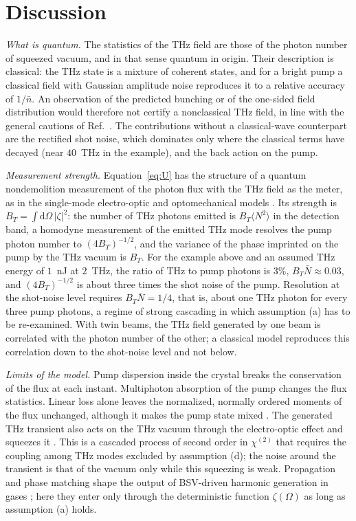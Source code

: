 \documentclass[aps,pra,reprint,superscriptaddress,amsmath,amssymb,floatfix]{revtex4-2}
\newcommand{\nbar}{\bar n}
\newcommand{\Nbar}{\bar N}
\newcommand{\dd}{\mathrm{d}}
\begin{document}
\section{Discussion}
\label{sec:discussion}

\emph{What is quantum.} The statistics of the THz field are those of the
photon number of squeezed vacuum, and in that sense quantum in origin. Their
description is classical: the THz state is a mixture of coherent states, and
for a bright pump a classical field with Gaussian amplitude noise reproduces
it to a relative accuracy of $1/\nbar$. An observation of the predicted
bunching or of the one-sided field distribution would therefore not certify a
nonclassical THz field, in line with the general cautions of
Ref.~\cite{gothelf2026}. The contributions without a classical-wave
counterpart are the rectified shot noise, which dominates only where the
classical terms have decayed (near $40$~THz in the example), and the back
action on the pump.

\emph{Measurement strength.} Equation~\eqref{eq:U} has the structure of a
quantum nondemolition measurement of the photon flux with the THz field as
the meter, as in the single-mode electro-optic and optomechanical models
\cite{tsang2010,bose1997}. Its strength is $B_T=\int\!\dd\Omega\,|\zeta|^2$:
the number of THz photons emitted is $B_T\langle N^2\rangle$ in the detection
band, a homodyne measurement of the emitted THz mode resolves the pump photon
number to $(4B_T)^{-1/2}$, and the variance of the phase imprinted on the pump
by the THz vacuum is $B_T$. For the example above and an assumed THz energy of
$1$~nJ at $2$~THz, the ratio of THz to pump photons is $3\%$,
$B_T\Nbar\approx0.03$, and $(4B_T)^{-1/2}$ is about three times the shot noise
of the pump. Resolution at the shot-noise level requires $B_T\Nbar=1/4$, that
is, about one THz photon for every three pump photons, a regime of strong
cascading \cite{ravi2014} in which assumption (a) has to be re-examined. With twin beams, the THz field
generated by one beam is correlated with the photon number of the other; a
classical model reproduces this correlation down to the shot-noise level and
not below.

\emph{Limits of the model.} Pump dispersion inside the crystal breaks the
conservation of the flux at each instant. Multiphoton absorption of the pump
changes the flux statistics. Linear loss alone leaves the normalized,
normally ordered moments of the flux unchanged, although it makes the pump
state mixed \cite{riveradean2025}. The generated THz transient also acts on
the THz vacuum through the electro-optic effect and squeezes it
\cite{riek2017,kizmann2019}. This is a cascaded process of second order in
$\chi^{(2)}$ that requires the coupling among THz modes excluded by
assumption (d); the noise around the transient is that of the vacuum only
while this squeezing is weak. Propagation and phase matching shape the
output of BSV-driven harmonic generation in gases
\cite{riveradean2025,wanghhg2026}; here they enter only through the
deterministic function $\zeta(\Omega)$ as long as assumption (a) holds.
\end{document}
